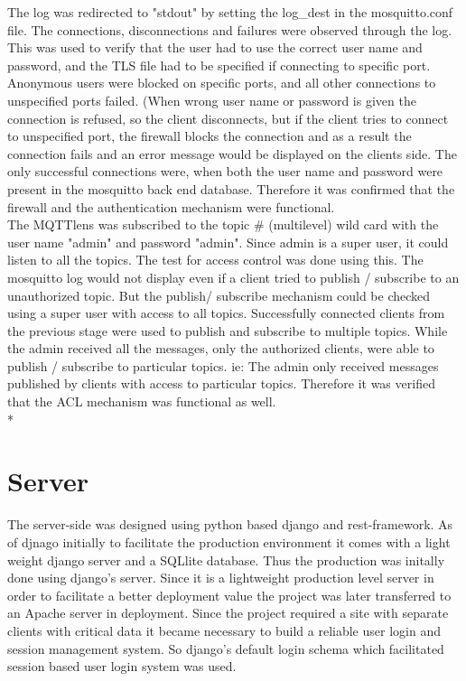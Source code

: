 \documentclass{report}
\begin{document}
The log was redirected to "stdout" by setting the log\_dest in the mosquitto.conf file. The connections, disconnections and failures were observed through the log. This was used to verify that the user had to use the correct user name and password, and the TLS file had to be specified if connecting to specific port. Anonymous users were blocked on specific ports, and all other connections to unspecified ports failed. (When wrong user name or password is given the connection is refused, so the client disconnects, but if the client tries to connect to unspecified port, the firewall blocks the connection and as a result the connection fails and an error message would be displayed on the clients side. The only successful connections were, when both the user name and password were present in the mosquitto back end database. Therefore it was confirmed that the firewall and the authentication mechanism were functional.\\

The MQTTlens was subscribed to the topic # (multilevel) wild card with the user name "admin" and password "admin". Since admin is a super user, it could listen to all the topics. The test for access control was done using this. The mosquitto log would not display even if a client tried to publish / subscribe to an unauthorized topic. But the publish/ subscribe mechanism could be checked using a super user with access to all topics. Successfully connected clients from the previous stage were used to publish and subscribe to multiple topics. While the admin received all the messages, only the authorized clients, were able to publish / subscribe to particular topics. ie: The admin only received messages published by clients with access to particular topics. Therefore it was verified that the ACL mechanism was functional as well.\\*
\clearpage
\section{Server}                
The server-side was designed using python based django and rest-framework. As of djnago initially to facilitate the production environment it comes with a light weight django server and a SQLlite database. Thus the production was initally done using django's server. Since it is a lightweight production level server in order to facilitate a better deployment value the project was later transferred to an Apache server in deployment. Since the project required a site with separate clients with critical data it became necessary to build a reliable user login and session management system. So django's default login schema which facilitated session based user login system was used. \\
\end{document}
